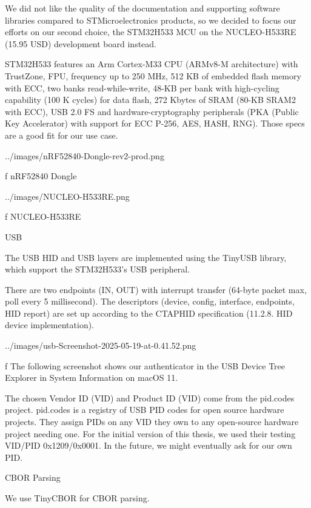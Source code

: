We did not like the quality of the documentation and supporting software libraries compared to STMicroelectronics products, so {\sbf we decided to focus our efforts on our second choice, the STM32H533 MCU on the NUCLEO-H533RE (15.95 USD) development board instead}.

STM32H533 features an Arm Cortex-M33 CPU (ARMv8-M architecture) with TrustZone, FPU, frequency up to 250 MHz, 512 KB of embedded flash memory with ECC, two banks read-while-write, 48-KB per bank with high-cycling capability (100 K cycles) for data flash, 272 Kbytes of SRAM (80-KB SRAM2 with ECC), USB 2.0 FS and hardware-cryptography peripherals (PKA (Public Key Accelerator) with support for ECC P-256, AES, HASH, RNG). Those specs are a good fit for our use case.

\midinsert
{}
\picheight=4cm \cinspic ../images/nRF52840-Dongle-rev2-prod.png
\caption/f nRF52840 Dongle
\endinsert

\midinsert
{}
\picheight=6cm \cinspic ../images/NUCLEO-H533RE.png
\caption/f NUCLEO-H533RE
\endinsert


\sec USB

The USB HID and USB layers are implemented using the TinyUSB library, which support the STM32H533's USB peripheral.

There are two endpoints (IN, OUT) with interrupt transfer (64-byte packet max, poll every 5 millisecond). The descriptors (device, config, interface, endpoints, HID report) are set up according to the CTAPHID specification (11.2.8. HID device implementation).

\midinsert
{}
\picw=120mm \cinspic ../images/usb-Screenshot-2025-05-19-at-0.41.52.png
\caption/f The following screenshot shows our authenticator in the USB Device Tree Explorer in System Information on macOS 11.

The chosen Vendor ID (VID) and Product ID (VID) come from the pid.codes project.
pid.codes is a registry of USB PID codes for open source hardware projects. They assign PIDs on any VID they own to any open-source hardware project needing one.
For the initial version of this thesis, we used their testing VID/PID 0x1209/0x0001. In the future, we might eventually ask for our own PID.

\endinsert


\sec CBOR Parsing

We use TinyCBOR for CBOR parsing.


